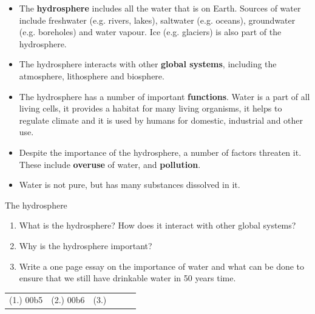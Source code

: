       \label{m38138*id342453}\begin{itemize}[noitemsep]
            \label{m38138*uid92}\item The \textbf{hydrosphere} includes all the water that is on Earth. Sources of water include freshwater (e.g. rivers, lakes), saltwater (e.g. oceans), groundwater (e.g. boreholes) and water vapour. Ice (e.g. glaciers) is also part of the hydrosphere.
\label{m38138*uid93}\item The hydrosphere interacts with other \textbf{global systems}, including the atmosphere, lithosphere and biosphere.
\label{m38138*uid94}\item The hydrosphere has a number of important \textbf{functions}. Water is a part of all living cells, it provides a habitat for many living organisms, it helps to regulate climate and it is used by humans for domestic, industrial and other use.
\label{m38138*uid106}\item Despite the importance of the hydrosphere, a number of factors threaten it. These include \textbf{overuse} of water, and \textbf{pollution}.
\item Water is not pure, but has many substances dissolved in it. 
\end{itemize}
\begin{eocexercises}{The hydrosphere}
            \nopagebreak
\label{m38138*fs-id1169173692606}\begin{enumerate}[noitemsep, label=\textbf{\arabic*}. ] 
            \item What is the hydrosphere? How does it interact with other global systems?\newline
            \item Why is the hydrosphere important?\newline
\item Write a one page essay on the importance of water and what can be done to ensure that we still have drinkable water in 50 years time.
\end{enumerate}
\practiceinfo
\par 
 \par \begin{tabular}[h]{cccccc}
 (1.) 00b5  &  (2.) 00b6  & (3.)  \end{tabular}
\end{eocexercises}

